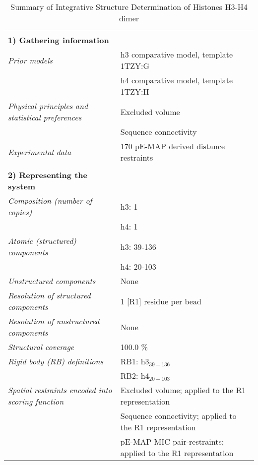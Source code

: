 \documentclass[8pt,a4paper]{article}
\begin{document}
\setcounter{table}{0}

\begin{longtable}{ p{} | p{} } 
\caption{Summary of Integrative Structure Determination of Histones H3-H4 dimer}
  
  &  \\
  \textbf{1) Gathering information} & \\
    \hline

            \textit{Prior models} & h3 comparative model, template 1TZY:G\\
            & h4 comparative model, template 1TZY:H \\
                \textit{Physical principles and statistical preferences} & Excluded volume\\
            & Sequence connectivity \\
                \textit{Experimental data} & 170 pE-MAP derived distance restraints\\
          
    &  \\
    \normalsize{\textbf{2) Representing the system}} & \\
    \hline
    
            \textit{Composition (number of copies)} & h3: 1\\
            & h4: 1 \\
                \textit{Atomic (structured) components} & h3: 39-136\\
            & h4: 20-103 \\
                \textit{Unstructured components} & None\\
                \textit{Resolution of structured components} & 1 [R1] residue per bead\\
                \textit{Resolution of unstructured components} & None\\
                \textit{Structural coverage} & 100.0 \%\\
                \textit{Rigid body (RB) definitions} & RB1: h3$_{39-136}$\\
            & RB2: h4$_{20-103}$ \\
                \textit{Spatial restraints encoded into scoring function} & Excluded volume; applied to the R1 representation\\
            & Sequence connectivity; applied to the R1 representation \\
            & pE-MAP MIC pair-restraints; applied to the R1 representation \\
          



\end{longtable}
\end{document}

